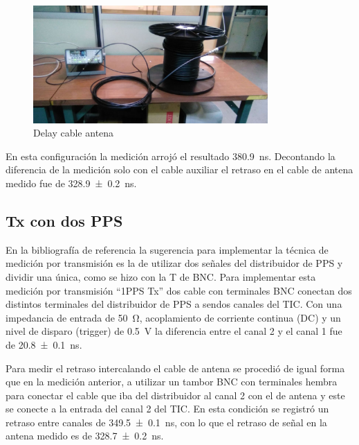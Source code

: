 \documentclass[11pt]{article}
\begin{document}
\begin{figure}[ht]
    \begin{center}
        \includegraphics[width=0.8\textwidth]{./figuras/2.jpg}
        \caption{Delay cable antena}
        \label{fig:TXtrucho}
    \end{center}
\end{figure}

En esta configuración la medición arrojó el resultado \SI{380.9}{\nano\second}.
Decontando la diferencia de la medición solo con el cable auxiliar el retraso en el cable de antena medido fue de \SI{328.9\pm0.2}{\nano\second}.


\subsection{Tx con dos PPS}

En la bibliografía de referencia  \cite{rovera_techniques_2015} la sugerencia para implementar la técnica de medición por transmisión es la de utilizar dos señales del distribuidor de PPS y dividir una única, como se hizo con la T de BNC.
Para implementar esta medición por transmisión ``1PPS Tx'' dos cable con terminales BNC conectan dos distintos terminales del distribuidor de PPS a sendos canales del TIC.
Con una impedancia de entrada de \SI{50}{\ohm}, acoplamiento de corriente continua (DC) y un nivel de disparo (trigger) de \SI{0.5}{\volt} la diferencia entre el canal 2 y el canal 1 fue de \SI{20.8\pm0.1}{\nano\second}.

Para medir el retraso intercalando el cable de antena se procedió de igual forma que en la medición anterior, a utilizar un tambor BNC con terminales hembra para conectar el cable que iba del distribuidor al canal 2 con el de antena y este se conecte a la entrada del canal 2 del TIC.
En esta condición se registró un retraso entre canales de \SI{349.5\pm0.1}{\nano\second}, con lo que el retraso de señal en la antena medido es de \SI{328.7\pm0.2}{\nano\second}.
\end{document}

